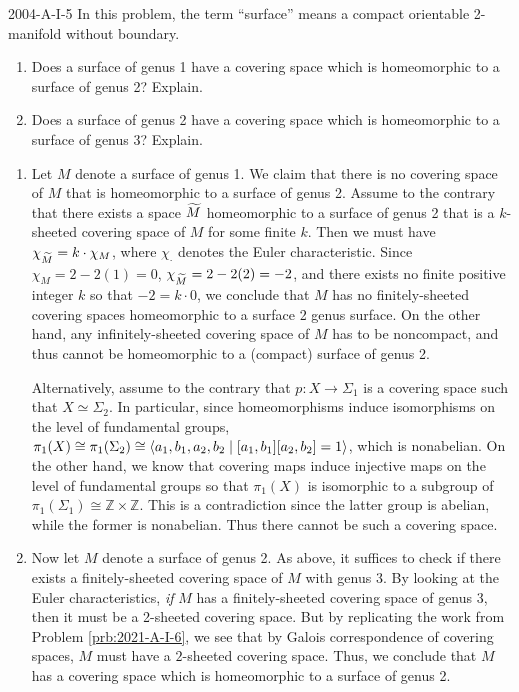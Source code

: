\documentclass{article}
\begin{document}
	\begin{prb}{2004-A-I-5}
		In this problem, the term ``surface'' means a compact orientable 2-manifold without boundary. \vspace{-0.25cm}
		\begin{enumerate}[itemsep =-2pt,label = (\alph{*})]
			\item Does a surface of genus 1 have a covering space which is homeomorphic to a surface of genus 2? Explain. 
			\item Does a surface of genus 2 have a covering space which is homeomorphic to a surface of genus 3? Explain. 
		\end{enumerate}
	\end{prb}
	\begin{enumerate}[itemsep =-2pt,label = (\alph{*})]
		\item Let $M$ denote a surface of genus 1. We claim that there is no covering space of $M$ that is homeomorphic to a surface of genus 2. Assume to the contrary that there exists a space $\widetilde{M}$ homeomorphic to a surface of genus 2 that is a $k$-sheeted covering space of $M$ for some finite $k$. Then we must have $\chi_{\widetilde{M}} = k \cdot \chi_{M}$, where $\chi_{\cdot}$ denotes the Euler characteristic. Since $\chi_{M} = 2- 2(1) = 0$, $\chi_{\widetilde{M}} = 2 - 2(2) = -2$, and there exists no finite positive integer $k$ so that $-2 = k \cdot 0$, we conclude that $M$ has no finitely-sheeted covering spaces homeomorphic to a surface 2 genus surface. On the other hand, any infinitely-sheeted covering space of $M$ has to be noncompact, and thus cannot be homeomorphic to a (compact) surface of genus 2. 
		
		Alternatively, assume to the contrary that $p: X \to \Sigma_{1}$ is a covering space such that $X \simeq \Sigma_{2}$. In particular, since homeomorphisms induce isomorphisms on the level of fundamental groups, $\pi_{1}(X) \cong \pi_{1}(\Sigma_{2}) \cong \braket{a_{1}, b_{1}, a_{2}, b_{2} \mid [a_{1}, b_{1}][a_{2}, b_{2}] = 1}$, which is nonabelian. On the other hand, we know that covering maps induce injective maps on the level of fundamental groups so that $\pi_{1}(X)$ is isomorphic to a subgroup of $\pi_{1}(\Sigma_{1}) \cong \mathbb{Z} \times \mathbb{Z}$. This is a contradiction since the latter group is abelian, while the former is nonabelian. Thus there cannot be such a covering space. 
		\item Now let $M$ denote a surface of genus 2. As above, it suffices to check if there exists a finitely-sheeted covering space of $M$ with genus 3. By looking at the Euler characteristics, \textit{if} $M$ has a finitely-sheeted covering space of genus 3, then it must be a 2-sheeted covering space. But by replicating the work from Problem \ref{prb:2021-A-I-6}, we see that by Galois correspondence of covering spaces, $M$ must have a $2$-sheeted covering space. Thus, we conclude that $M$ has a covering space which is homeomorphic to a surface of genus 2. 
	\end{enumerate}
	
\end{document}
